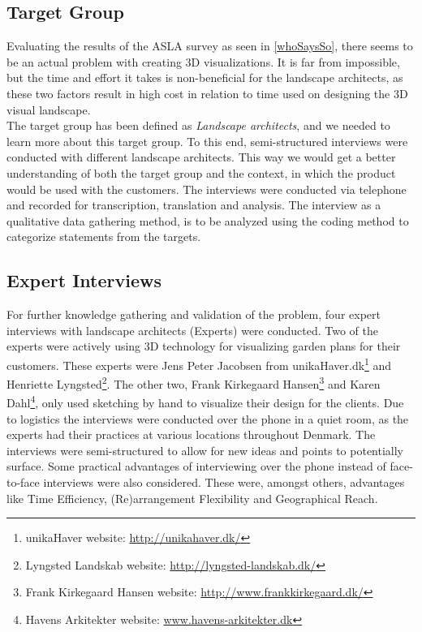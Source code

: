 	\subsection{Target Group}\label{sec:targetGroup}
	Evaluating the results of the ASLA survey as seen in \autoref{whoSaysSo}, there seems to be an actual problem with creating 3D visualizations. It is far from impossible, but the time and effort it takes is non-beneficial for the landscape architects, as these two factors result in high cost in relation to time used on designing the 3D visual landscape. \\
	The target group has been defined as \textit{Landscape architects}, and we needed to learn more about this target group. To this end, semi-structured interviews were conducted with different landscape architects. This way we would get a better understanding of both the target group and the context, in which the product would be used with the customers. The interviews were conducted via telephone and recorded for transcription, translation and analysis. The interview as a qualitative data gathering method, is to be analyzed using the coding method to categorize statements from the targets.
	
	\subsection{Expert Interviews}\label{sec:expertInterviews}
	For further knowledge gathering and validation of the problem, four expert interviews with landscape architects (Experts) were conducted. Two of the experts were actively using 3D technology for visualizing garden plans for their customers. These experts were Jens Peter Jacobsen from unikaHaver.dk\footnote{unikaHaver website: \url{http://unikahaver.dk/}} and Henriette Lyngsted\footnote{Lyngsted Landskab website: \url{http://lyngsted-landskab.dk/}}. The other two, Frank Kirkegaard Hansen\footnote{Frank Kirkegaard Hansen website: \url{http://www.frankkirkegaard.dk/}} and Karen Dahl\footnote{Havens Arkitekter website: \url{www.havens-arkitekter.dk}}, only used sketching by hand to visualize their design for the clients. Due to logistics the interviews were conducted over the phone in a quiet room, as the experts had their practices at various locations throughout Denmark. The interviews were semi-structured to allow for new ideas and points to potentially surface. Some practical advantages of interviewing over the phone instead of face-to-face interviews were also considered. These were, amongst others, advantages like Time Efficiency, (Re)arrangement Flexibility and Geographical Reach\cite{telephoneInterview}.
	
